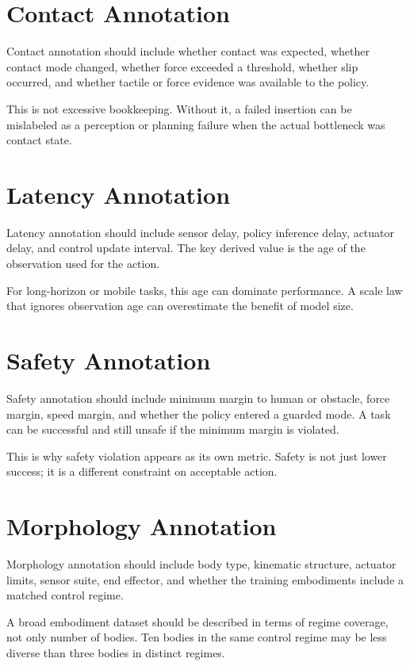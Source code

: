 \section{Contact Annotation}

Contact annotation should include whether contact was expected, whether contact mode changed, whether force exceeded a threshold, whether slip occurred, and whether tactile or force evidence was available to the policy.

This is not excessive bookkeeping. Without it, a failed insertion can be mislabeled as a perception or planning failure when the actual bottleneck was contact state.

\section{Latency Annotation}

Latency annotation should include sensor delay, policy inference delay, actuator delay, and control update interval. The key derived value is the age of the observation used for the action.

For long-horizon or mobile tasks, this age can dominate performance. A scale law that ignores observation age can overestimate the benefit of model size.

\section{Safety Annotation}

Safety annotation should include minimum margin to human or obstacle, force margin, speed margin, and whether the policy entered a guarded mode. A task can be successful and still unsafe if the minimum margin is violated.

This is why safety violation appears as its own metric. Safety is not just lower success; it is a different constraint on acceptable action.

\section{Morphology Annotation}

Morphology annotation should include body type, kinematic structure, actuator limits, sensor suite, end effector, and whether the training embodiments include a matched control regime.

A broad embodiment dataset should be described in terms of regime coverage, not only number of bodies. Ten bodies in the same control regime may be less diverse than three bodies in distinct regimes.

